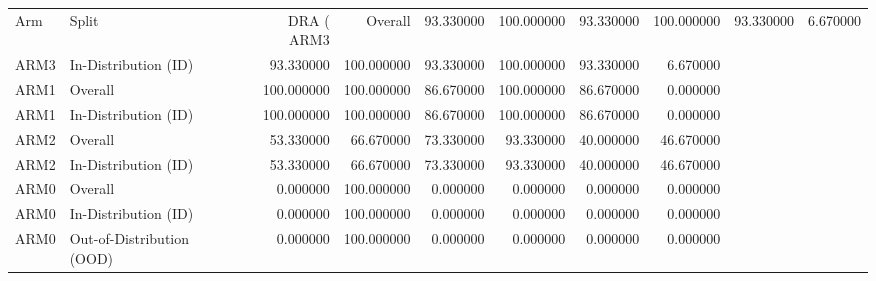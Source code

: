\begin{tabular}{llrrrrrr}
\toprule
Arm & Split & DRA (%
\midrule
ARM3 & Overall & 93.330000 & 100.000000 & 93.330000 & 100.000000 & 93.330000 & 6.670000 \\
ARM3 & In-Distribution (ID) & 93.330000 & 100.000000 & 93.330000 & 100.000000 & 93.330000 & 6.670000 \\
ARM1 & Overall & 100.000000 & 100.000000 & 86.670000 & 100.000000 & 86.670000 & 0.000000 \\
ARM1 & In-Distribution (ID) & 100.000000 & 100.000000 & 86.670000 & 100.000000 & 86.670000 & 0.000000 \\
ARM2 & Overall & 53.330000 & 66.670000 & 73.330000 & 93.330000 & 40.000000 & 46.670000 \\
ARM2 & In-Distribution (ID) & 53.330000 & 66.670000 & 73.330000 & 93.330000 & 40.000000 & 46.670000 \\
ARM0 & Overall & 0.000000 & 100.000000 & 0.000000 & 0.000000 & 0.000000 & 0.000000 \\
ARM0 & In-Distribution (ID) & 0.000000 & 100.000000 & 0.000000 & 0.000000 & 0.000000 & 0.000000 \\
ARM0 & Out-of-Distribution (OOD) & 0.000000 & 100.000000 & 0.000000 & 0.000000 & 0.000000 & 0.000000 \\
\bottomrule
\end{tabular}
